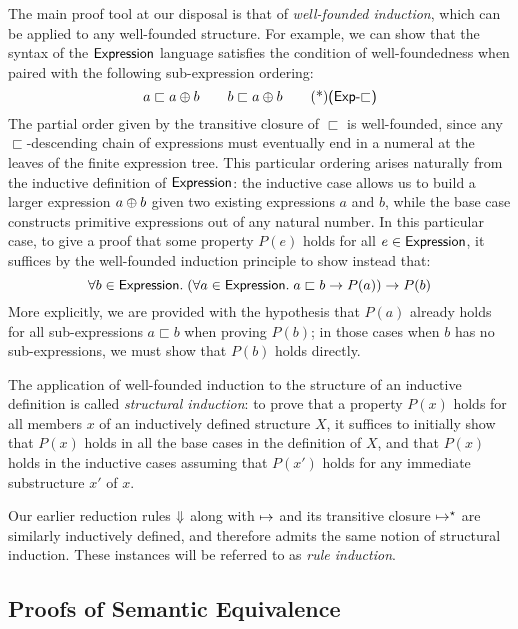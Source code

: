 \def\subExp{\sqsubset}

The main proof tool at our disposal is that of \emph{well-founded
induction}, which can be applied to any well-founded structure. For example,
we can show that the syntax of the $\textsf{Expression}$ language satisfies the
condition of well-foundedness when paired with the following sub-expression
ordering:
\[
	a \subExp a \Add b \qquad b \subExp a \Add b \eqTag{Exp-$\subExp$}
\]
The partial order given by the transitive closure of $\subExp$ is
well-founded, since any $\subExp$-descending chain of expressions must
eventually end in a numeral at the leaves of the finite expression tree.
This particular ordering arises naturally from the inductive definition of
$\textsf{Expression}$: the inductive case  allows us to build
a larger expression $a \oplus b$ given two existing expressions $a$ and $b$,
while the base case  constructs primitive
expressions out of any natural number. In this particular case, to give
a proof that some property $P(e)$ holds for all $e \in \textsf{Expression}$, it
suffices by the well-founded induction principle to show instead that:
\[
	\forall b \in \Expression.\;
		(\forall a \in \Expression.\; a \subExp b \rightarrow P(a))
		\rightarrow P(b)
\]
More explicitly, we are provided with the hypothesis that $P(a)$ already
holds for all sub-expressions $a \subExp b$ when proving $P(b)$; in those
cases when $b$ has no sub-expressions, we must show that $P(b)$ holds
directly.

The application of well-founded induction to the structure of an inductive
definition is called \emph{structural induction}: to prove that a property
$P(x)$ holds for all members $x$ of an inductively defined structure $X$, it
suffices to initially show that $P(x)$ holds in all the base cases in the
definition of $X$, and that $P(x)$ holds in the inductive cases assuming
that $P(x')$ holds for any immediate substructure $x'$ of $x$.

Our earlier reduction rules ${\Downarrow}$ along with ${\mapsto}$ and its
transitive closure ${\mapsto^\star}$ are similarly inductively defined, and
therefore admits the same notion of structural induction. These instances
will be referred to as \emph{rule induction}.


\subsection{Proofs of Semantic Equivalence}\label{sec:semantic-equivalence}%

